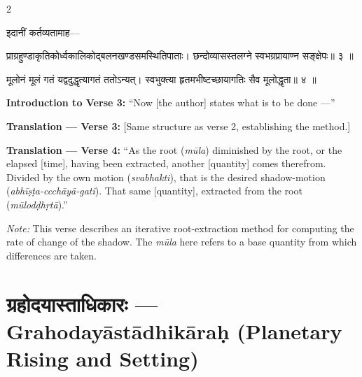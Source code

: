 \documentclass[11pt,a4paper]{article}
\newcommand{\dev}[1]{{\devanagarifont #1}}
\newenvironment{sanskritverse}{%
  \begin{center}\begin{minipage}{0.95\textwidth}
  \setlength{\leftskip}{1em}
  \setlength{\rightskip}{1em}
  \dev
}{\end{minipage}\end{center}}
\begin{document}
\begin{paracol}{2}

\begin{sanskritverse}
इदानीं कर्तव्यतामाह—
\end{sanskritverse}

\begin{sanskritverse}
प्राग्रहुण्डाकृतिकोर्ध्वकालिकोद्बलनखण्डसमस्थितिपाताः।
छन्दोव्यासस्तलग्ने स्वभग्रप्रायाण्न सङ्क्षेपः॥ ३ ॥
\end{sanskritverse}

\begin{sanskritverse}
मूलोनं मूलं गतं यद्वदुद्धृत्यागतं ततोऽन्यत्।
स्वभुक्त्या हृतमभीष्टच्छायागतिः सैव मूलोद्धृता॥ ४ ॥
\end{sanskritverse}

\switchcolumn

\textbf{Introduction to Verse 3:} ``Now [the author] states what is to be done ---''

\textbf{Translation — Verse 3:} [Same structure as verse 2, establishing the method.]

\textbf{Translation — Verse 4:} ``As the root (\textit{mūla}) diminished by the root, or the elapsed [time], having been extracted, another [quantity] comes therefrom. Divided by the own motion (\textit{svabhakti}), that is the desired shadow-motion (\textit{abhīṣṭa-ccchāyā-gati}). That same [quantity], extracted from the root (\textit{mūlodḍhṛtā}).''

\textit{Note:} This verse describes an iterative root-extraction method for computing the rate of change of the shadow. The \textit{mūla} here refers to a base quantity from which differences are taken.

\end{paracol}

\newpage


\section{\texorpdfstring{{\devanagarifont ग्रहोदयास्ताधिकारः} — Grahodayāstādhikāraḥ (Planetary Rising and Setting)}{Grahodayāstādhikāraḥ (Planetary Rising and Setting)}}
\label{sec:grahodayasta}
\end{document}
